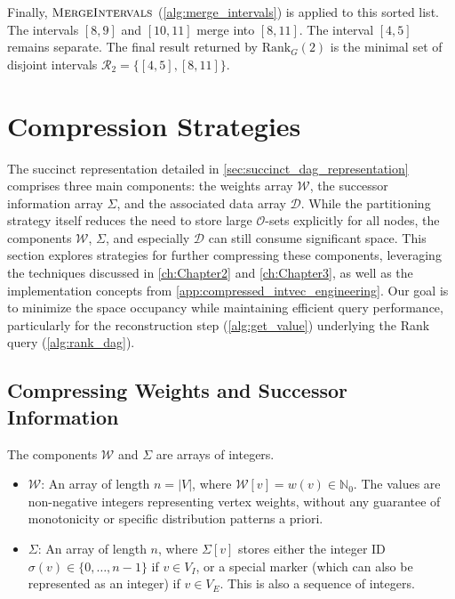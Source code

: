 Finally, $\textsc{MergeIntervals}$ (\ref{alg:merge_intervals}) is applied to this sorted list. The intervals $[8, 9]$ and $[10, 11]$ merge into $[8, 11]$. The interval $[4, 5]$ remains separate. The final result returned by $\mathrm{Rank}_G(2)$ is the minimal set of disjoint intervals $\mathcal{R}_2 = \{ [4, 5], [8, 11] \}$.

\section{Compression Strategies}
\label{sec:compression_strategies}

The succinct representation detailed in \autoref{sec:succinct_dag_representation} comprises three main components: the weights array $\mathcal{W}$, the successor information array $\Sigma$, and the associated data array $\mathcal{D}$. While the partitioning strategy itself reduces the need to store large $\mathcal{O}$-sets explicitly for all nodes, the components $\mathcal{W}$, $\Sigma$, and especially $\mathcal{D}$ can still consume significant space. This section explores strategies for further compressing these components, leveraging the techniques discussed in \autoref{ch:Chapter2} and \autoref{ch:Chapter3}, as well as the implementation concepts from \autoref{app:compressed_intvec_engineering}. Our goal is to minimize the space occupancy while maintaining efficient query performance, particularly for the reconstruction step (\autoref{alg:get_value}) underlying the Rank query (\autoref{alg:rank_dag}).

\subsection{Compressing Weights and Successor Information}
\label{subsec:compressing_W_Sigma}

The components $\mathcal{W}$ and $\Sigma$ are arrays of integers.
\begin{itemize}
    \item $\mathcal{W}$: An array of length $n = |V|$, where $\mathcal{W}[v] = w(v) \in \mathbb{N}_0$. The values are non-negative integers representing vertex weights, without any guarantee of monotonicity or specific distribution patterns a priori.
    \item $\Sigma$: An array of length $n$, where $\Sigma[v]$ stores either the integer ID $\sigma(v) \in \{0, \dots, n-1\}$ if $v \in V_I$, or a special marker (which can also be represented as an integer) if $v \in V_E$. This is also a sequence of integers.
\end{itemize}

